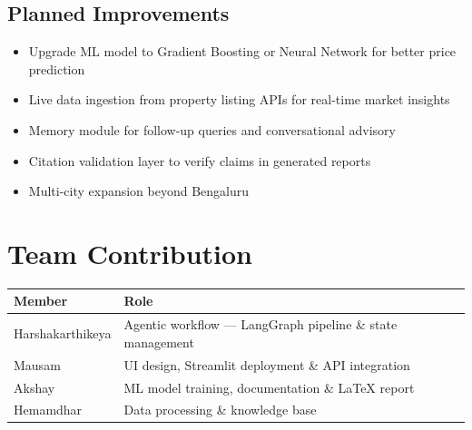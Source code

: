 \documentclass[11pt,a4paper]{article}
\newcommand{\tableheadercolor}{\rowcolor{headerblue}}
\newcommand{\tableheaderfont}{\color{white}\bfseries}
\begin{document}
\subsection{Planned Improvements}

\begin{itemize}
    \item Upgrade ML model to Gradient Boosting or Neural Network for better price prediction
    \item Live data ingestion from property listing APIs for real-time market insights
    \item Memory module for follow-up queries and conversational advisory
    \item Citation validation layer to verify claims in generated reports
    \item Multi-city expansion beyond Bengaluru
\end{itemize}

\vspace{1.5em}


\section{Team Contribution}

\vspace{0.6em}
\begin{tabularx}{\textwidth}{>{\raggedright\arraybackslash}p{5cm}
                              >{\raggedright\arraybackslash}X}
\tableheadercolor
\tableheaderfont Member & \tableheaderfont Role \\
\midrule
Harshakarthikeya     & Agentic workflow --- LangGraph pipeline \& state management       \\[6pt]
Mausam               & UI design, Streamlit deployment \& API integration                \\[6pt]
Akshay               & ML model training, documentation \& LaTeX report                  \\[6pt]
Hemamdhar            & Data processing \& knowledge base                                 \\
\bottomrule
\end{tabularx}

\vspace{1.5em}

\end{document}
